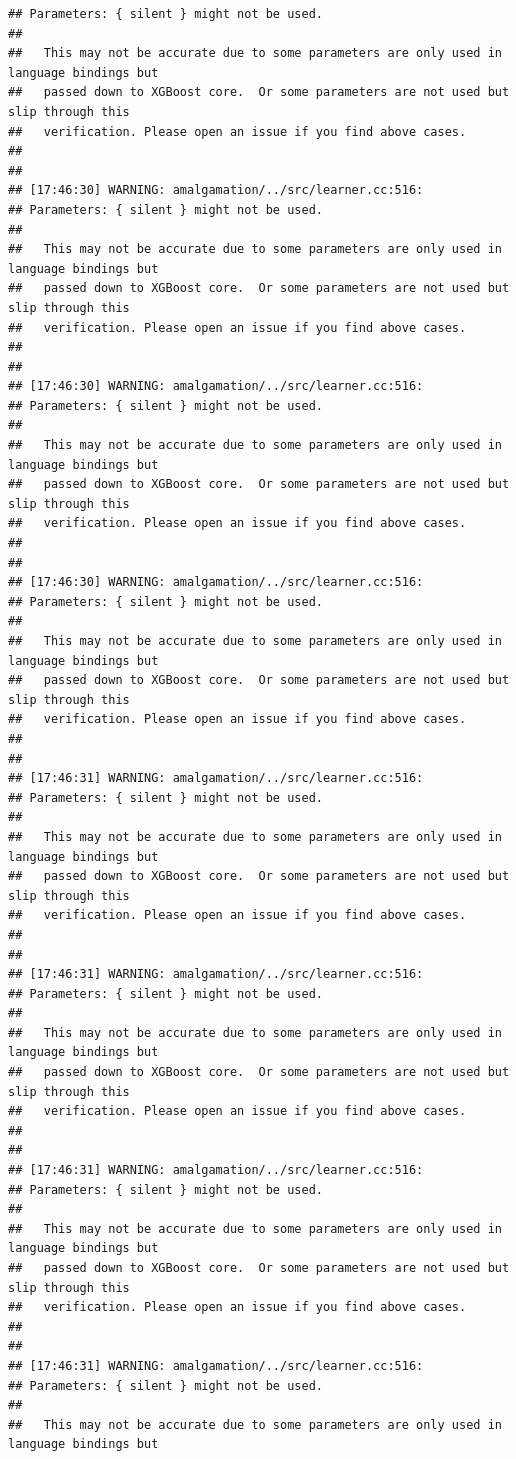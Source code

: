 \documentclass[AMS,STIX2COL]{WileyNJD-v2}\usepackage[]{graphicx}\usepackage[]{color}
\makeatletter
\newenvironment{kframe}{%
 \def\at@end@of@kframe{}%
 \ifinner\ifhmode%
  \def\at@end@of@kframe{\end{minipage}}%
  \begin{minipage}{\columnwidth}%
 \fi\fi%
 \def\FrameCommand##1{\hskip\@totalleftmargin \hskip-\fboxsep
 \colorbox{shadecolor}{##1}\hskip-\fboxsep
     \hskip-\linewidth \hskip-\@totalleftmargin \hskip\columnwidth}%
 \MakeFramed {\advance\hsize-\width
   \@totalleftmargin\z@ \linewidth\hsize
   \@setminipage}}%
 {\par\unskip\endMakeFramed%
 \at@end@of@kframe}
\newenvironment{knitrout}{}{} %
\makeatother
\begin{document}
\begin{knitrout}
\begin{kframe}
\begin{verbatim}
## Parameters: { silent } might not be used.
## 
##   This may not be accurate due to some parameters are only used in language bindings but
##   passed down to XGBoost core.  Or some parameters are not used but slip through this
##   verification. Please open an issue if you find above cases.
## 
## 
## [17:46:30] WARNING: amalgamation/../src/learner.cc:516: 
## Parameters: { silent } might not be used.
## 
##   This may not be accurate due to some parameters are only used in language bindings but
##   passed down to XGBoost core.  Or some parameters are not used but slip through this
##   verification. Please open an issue if you find above cases.
## 
## 
## [17:46:30] WARNING: amalgamation/../src/learner.cc:516: 
## Parameters: { silent } might not be used.
## 
##   This may not be accurate due to some parameters are only used in language bindings but
##   passed down to XGBoost core.  Or some parameters are not used but slip through this
##   verification. Please open an issue if you find above cases.
## 
## 
## [17:46:30] WARNING: amalgamation/../src/learner.cc:516: 
## Parameters: { silent } might not be used.
## 
##   This may not be accurate due to some parameters are only used in language bindings but
##   passed down to XGBoost core.  Or some parameters are not used but slip through this
##   verification. Please open an issue if you find above cases.
## 
## 
## [17:46:31] WARNING: amalgamation/../src/learner.cc:516: 
## Parameters: { silent } might not be used.
## 
##   This may not be accurate due to some parameters are only used in language bindings but
##   passed down to XGBoost core.  Or some parameters are not used but slip through this
##   verification. Please open an issue if you find above cases.
## 
## 
## [17:46:31] WARNING: amalgamation/../src/learner.cc:516: 
## Parameters: { silent } might not be used.
## 
##   This may not be accurate due to some parameters are only used in language bindings but
##   passed down to XGBoost core.  Or some parameters are not used but slip through this
##   verification. Please open an issue if you find above cases.
## 
## 
## [17:46:31] WARNING: amalgamation/../src/learner.cc:516: 
## Parameters: { silent } might not be used.
## 
##   This may not be accurate due to some parameters are only used in language bindings but
##   passed down to XGBoost core.  Or some parameters are not used but slip through this
##   verification. Please open an issue if you find above cases.
## 
## 
## [17:46:31] WARNING: amalgamation/../src/learner.cc:516: 
## Parameters: { silent } might not be used.
## 
##   This may not be accurate due to some parameters are only used in language bindings but

\end{verbatim}
\end{kframe}
\end{knitrout}
\end{document}
